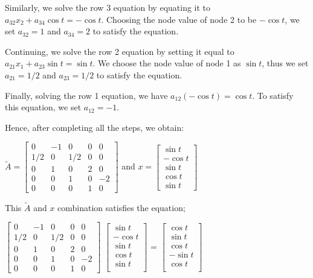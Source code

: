 \begin{example}
Similarly, we solve the row 3 equation by equating it to $a_{32}x_2 +a_{34} \cos t= -\cos t$. Choosing the node value of node 2 to be $-\cos t$, we set $a_{32} = 1$ and $a_{34} = 2$ to satisfy the equation.

Continuing, we solve the row 2 equation by setting it equal to $a_{21}x_1 +a_{23} \sin t= \sin t$. We choose the node value of node 1 as $\sin t$, thus we set $a_{21} = 1/2$ and $a_{23} = 1/2$ to satisfy the equation.

Finally, solving the row 1 equation, we have $a_{12}(-\cos t) = \cos t$. To satisfy this equation, we set $a_{12}=-1$.

 Hence, after completing all the steps, we obtain:
\begin{center}
	$\tilde{A}=
	\begin{bmatrix}
		0 & -1 & 0 & 0 & 0 \\
		1/2 & 0 & 1/2 & 0 & 0 \\
		0 & 1 & 0 & 2 & 0 \\
		0 & 0 & 1 & 0 & -2 \\
		0 & 0 & 0 & 1 & 0
	\end{bmatrix}$
	and $x=
	\begin{bmatrix}
		\sin t \\
		-\cos t \\
		\sin t \\
		\cos t \\
		\sin t
	\end{bmatrix}$
\end{center}

This $\tilde{A}$ and $x$ combination satisfies the equation;
 \begin{center}
		$\begin{bmatrix}
				0& -1 & 0& 0 &0\\
				1/2& 0& 1/2 & 0& 0\\
				0 & 1 & 0& 2 & 0\\
				0& 0 & 1& 0 & -2\\
				0 &0 &0 &1 & 0
			\end{bmatrix}$
		$\begin{bmatrix}
				\sin t \\
				-\cos t \\
				\sin t \\
				\cos t \\
				\sin t \\
			\end{bmatrix}$
	 =
	$\begin{bmatrix}
			\cos t \\
			\sin t\\
			\cos t\\
			-\sin t\\
			\cos t \\
		\end{bmatrix}$
		\end{center}
\end{example}

